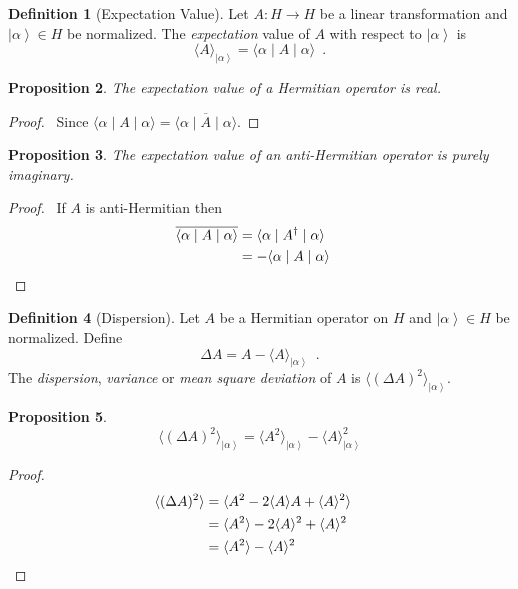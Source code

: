 \documentclass{book}
\let\qed\relax
\newtheorem{prop}{Proposition}[chapter]
\theoremstyle{definition}
\newtheorem{df}[prop]{Definition}
\newcommand{\ket}[1]{\ensuremath{\left| {#1} \right\rangle}}
\begin{document}
\begin{df}[Expectation Value]
Let $A : H \rightarrow H$ be a linear transformation and $\ket{\alpha} \in H$ be normalized. The \emph{expectation} value of $A$ with respect to $\ket{\alpha}$ is
\[ \langle A \rangle_{\ket{\alpha}} = \langle \alpha \mid A \mid \alpha \rangle \enspace . \]
\end{df}

\begin{prop}
The expectation value of a Hermitian operator is real.
\end{prop}

\begin{proof}
\pf\ Since $\langle \alpha \mid A \mid \alpha \rangle = \overline{\langle \alpha \mid A \mid \alpha \rangle}$. \qed
\end{proof}

\begin{prop}
The expectation value of an anti-Hermitian operator is purely imaginary.
\end{prop}

\begin{proof}
\pf\ If $A$ is anti-Hermitian then
\begin{align*}
\overline{\langle \alpha \mid A \mid \alpha \rangle}
& = \langle \alpha \mid A^\dagger \mid \alpha \rangle \\
& = - \langle \alpha \mid A \mid \alpha \rangle & \qed
\end{align*}
\end{proof}

\begin{df}[Dispersion]
Let $A$ be a Hermitian operator on $H$ and $\ket{\alpha} \in H$ be normalized. Define
\[ \Delta A = A - \langle A \rangle_{\ket{\alpha}} \enspace . \]
The \emph{dispersion}, \emph{variance} or \emph{mean square deviation} of $A$ is $\langle (\Delta A)^2 \rangle_{\ket{\alpha}}$.
\end{df}

\begin{prop}
\[ \langle (\Delta A)^2 \rangle_{\ket{\alpha}} = \langle A^2 \rangle_{\ket{\alpha}} - \langle A \rangle_{\ket{\alpha}}^2 \]
\end{prop}

\begin{proof}
\pf
\begin{align*}
\langle (\Delta A)^2 \rangle & = \langle A^2 - 2 \langle A \rangle A + \langle A \rangle^2 \rangle \\
& = \langle A^2 \rangle - 2 \langle A \rangle^2 + \langle A \rangle^2 \\
& = \langle A^2 \rangle - \langle A \rangle^2 & \qed
\end{align*}
\end{proof}
\end{document}
